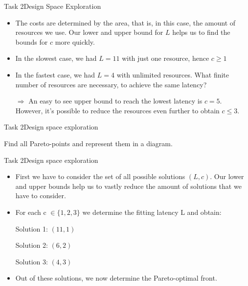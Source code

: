 \begin{frame}{Task 2}{Design Space Exploration}
    \begin{solution}
        \begin{itemize}
            \item The costs are determined by the area, that is, in this case, the amount of resources we use. Our lower and upper bound for $L$ helps us to find the bounds for $c$ more quickly.
            \item In the slowest case, we had $L = 11$ with just one resource, hence $c \geq 1$
            \item In the fastest case, we had $L = 4$ with unlimited resources. What finite number of resources are necessary, to achieve the same latency?
            \item [$\Rightarrow$] An easy to see upper bound to reach the lowest latency is $c = 5$. However, it's possible to reduce the resources even further to obtain $c \leq 3$.
        \end{itemize}
    \end{solution}
\end{frame}
\begin{frame}{Task 2}{Design space exploration}
    \begin{tasknoinc}
        Find all Pareto-points and represent them in a diagram.
    \end{tasknoinc}
\end{frame}
\begin{frame}{Task 2}{Design space exploration}
    \begin{solutionnoinc}
        \begin{itemize}
            \item First we have to consider the set of all possible solutions $(L, c)$. Our lower and upper bounds help us to vastly reduce the amount of solutions that we have to consider.
            \item For each c $\in \{1, 2, 3\}$ we determine the fitting latency L and obtain:
            \item [] Solution 1: $(11, 1)$
            \item [] Solution 2: $(6, 2)$
            \item [] Solution 3: $(4, 3)$
            \item Out of these solutions, we now determine the Pareto-optimal front.
        \end{itemize}
    \end{solutionnoinc}
\end{frame}
